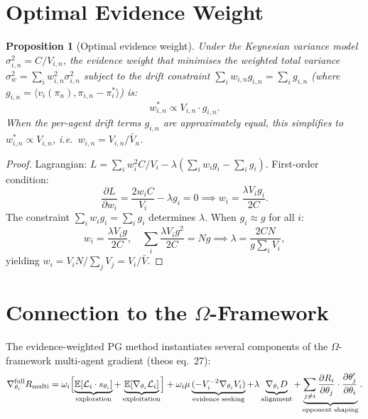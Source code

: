 \documentclass[11pt,a4paper]{article}
\newtheorem{proposition}[theorem]{Proposition}
\newcommand{\E}{\mathbb{E}}
\newcommand{\ip}[2]{\langle #1, #2 \rangle}
\begin{document}
\section{Optimal Evidence Weight}
\label{sec:optimal-weight}

\begin{proposition}[Optimal evidence weight]
\label{prop:optimal-weight}
Under the Keynesian variance model $\sigma_{i,n}^2 = C/V_{i,n}$, the evidence weight that minimises the weighted total variance $\sigma_w^2 = \sum_i w_{i,n}^2 \sigma_{i,n}^2$ subject to the drift constraint $\sum_i w_{i,n} g_{i,n} = \sum_i g_{i,n}$ (where $g_{i,n} = \ip{v_i(\pi_n)}{\pi_{i,n} - \pi_i^*}$) is:
\begin{equation}
\label{eq:optimal-weight}
    w_{i,n}^* \propto V_{i,n} \cdot g_{i,n}.
\end{equation}
When the per-agent drift terms $g_{i,n}$ are approximately equal, this simplifies to $w_{i,n}^* \propto V_{i,n}$, i.e.\ $w_{i,n} = V_{i,n} / \bar{V}_n$.
\end{proposition}

\begin{proof}
Lagrangian: $L = \sum_i w_i^2 C / V_i - \lambda(\sum_i w_i g_i - \sum_i g_i)$. First-order condition:
\[
    \frac{\partial L}{\partial w_i} = \frac{2 w_i C}{V_i} - \lambda g_i = 0 \implies w_i = \frac{\lambda V_i g_i}{2C}.
\]
The constraint $\sum_i w_i g_i = \sum_i g_i$ determines $\lambda$. When $g_i \approx g$ for all $i$:
\[
    w_i = \frac{\lambda V_i g}{2C}, \quad \sum_i \frac{\lambda V_i g^2}{2C} = Ng \implies \lambda = \frac{2CN}{g \sum_i V_i},
\]
yielding $w_i = V_i N / \sum_j V_j = V_i / \bar{V}$.
\end{proof}


\section{Connection to the $\Omega$-Framework}
\label{sec:omega}

The evidence-weighted PG method instantiates several components of the $\Omega$-framework multi-agent gradient (theos eq.\ 27):
\begin{equation}
    \nabla_{\theta_i}^{\text{full}} R_{\text{multi}} = \omega_i \Bigl[\underbrace{\E[\mathcal{L}_i \cdot s_{\theta_i}]}_{\text{exploration}} + \underbrace{\E[\nabla_{\theta_i} \mathcal{L}_i]}_{\text{exploitation}}\Bigr] + \omega_i \mu \underbrace{(-V_i^{-2} \nabla_{\theta_i} V_i)}_{\text{evidence seeking}} + \lambda \underbrace{\nabla_{\theta_i} D}_{\text{alignment}} + \underbrace{\sum_{j \neq i} \frac{\partial R_i}{\partial \theta_j} \cdot \frac{\partial \theta_j'}{\partial \theta_i}}_{\text{opponent shaping}}.
\end{equation}
\end{document}
